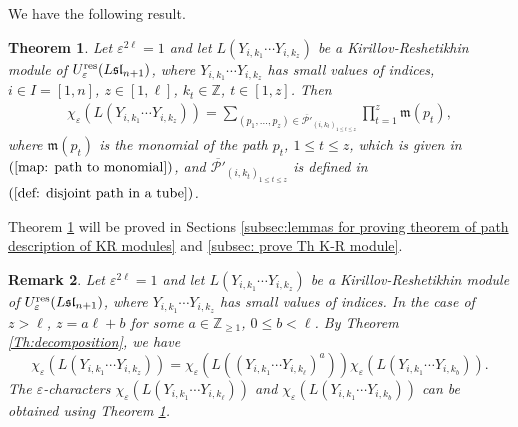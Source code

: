 \documentclass[12pt, reqno]{amsart}
\newtheorem{theorem}{Theorem}[section]
\newtheorem{remark}[theorem]{Remark}
\numberwithin{equation}{section}
\newcommand{\ZZ}{\mathbb{Z}}
\newcommand{\res}{{\rm res}}
\begin{document}
{We have the following result.
\begin{theorem}\label{Th: the path description of K-R module}
Let $\varepsilon^{2 \ell}=1$ and let $L(Y_{i,k_1}\cdots Y_{i,k_z})$ be a Kirillov-Reshetikhin module of $U_{\varepsilon}^{\res}({L\mathfrak{sl}_{n+1}})$, where $Y_{i,k_1}\cdots Y_{i,k_z}$ has small values of indices, $i \in I=[1,n]$, $z \in [1,\ell]$, $k_t \in \ZZ$, $t\in [1,z]$. Then
\begin{align*}
\chi_{\varepsilon}(L(Y_{i,k_1}\cdots Y_{i,k_z}))=\sum_{(p_{1},\ldots,p_{z}) \in \overline{\mathscr{P'}}_{(i,k_{t})_{1 \leq t \leq z}}} \prod_{t=1}^{z}\mathfrak{m}(p_{t}),
\end{align*}
where $\mathfrak{m}(p_t)$ is the monomial of the path $p_t$, $1\leq t\leq z$, which is given in $(\ref{map: path to monomial})$, and $\overline{\mathscr{P'}}_{{(i,k_{t})_{ 1\leq t\leq z}}}$ is defined in $(\ref{def: disjoint path in a tube})$.
\end{theorem}

Theorem \ref{Th: the path description of K-R module} will be proved in Sections \ref{subsec:lemmas for proving theorem of path description of KR modules} and \ref{subsec: prove Th K-R module}.

\begin{remark}\label{remark:path description for KR modules with large degree}
Let $\varepsilon^{2 \ell}=1$ and let $L(Y_{i,k_1}\cdots Y_{i,k_z})$ be a Kirillov-Reshetikhin module of $U_{\varepsilon}^{\res}({L\mathfrak{sl}_{n+1}})$, where $Y_{i,k_1}\cdots Y_{i,k_z}$ has small values of indices. In the case of $z>\ell$, $z=a \ell+b$ for some $a\in \mathbb{Z}_{\geq 1}$, $0\leq b< \ell$. By Theorem \ref{Th:decomposition}, we have
\[
\chi_{\varepsilon}(L(Y_{i,k_1}\cdots Y_{i,k_z}))=\chi_{\varepsilon}(L( (Y_{i,k_1}\cdots Y_{i,k_{\ell}})^a )) \chi_{\varepsilon}(L(Y_{i,k_1}\cdots Y_{i,k_b})).
\]
The $\varepsilon$-characters $\chi_{\varepsilon}(L(Y_{i,k_1}\cdots Y_{i,k_{\ell}}))$ and $\chi_{\varepsilon}(L(Y_{i,k_1}\cdots Y_{i,k_b}))$ can be obtained using Theorem \ref{Th: the path description of K-R module}.
\end{remark}


}
\end{document}
